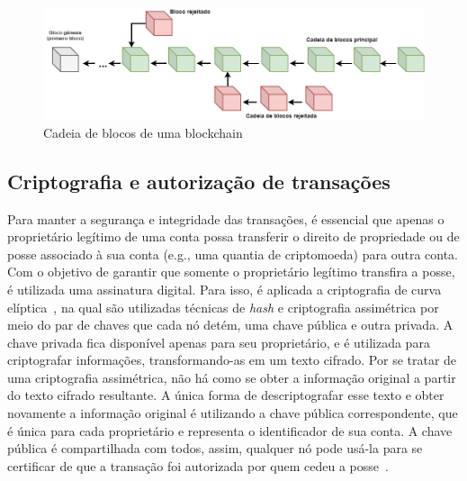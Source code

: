 \begin{figure}[htb]
 \caption{Cadeia de blocos de uma blockchain}
 \label{fig:cadeia_blocos}
 \centering
 \includegraphics[scale=0.4]{figuras/cadeia_de_blocos.png}
\end{figure}
 
\subsection{Criptografia e autorização de transações} \label{tex:fund:blockchain:cripto}

Para manter a segurança e integridade das transações, é essencial que apenas o proprietário legítimo de uma conta possa transferir o direito de propriedade ou de posse associado à sua conta (e.g., uma quantia de criptomoeda) para outra conta. Com o objetivo de garantir que somente o proprietário legítimo transfira a posse, é utilizada uma assinatura digital. Para isso, é aplicada a criptografia de curva elíptica~\cite{koblitz1987elliptic-curve}, na qual são utilizadas técnicas de \textit{hash} e criptografia assimétrica por meio do par de chaves que cada nó detém, uma chave pública e outra privada. A chave privada fica disponível apenas para seu proprietário, e é utilizada para criptografar informações, transformando-as em um texto cifrado. Por se tratar de uma criptografia assimétrica, não há como se obter a informação original a partir do texto cifrado resultante. A única forma de descriptografar esse texto e obter novamente a informação original é utilizando a chave pública correspondente, que é única para cada proprietário e representa o identificador de sua conta. A chave pública é compartilhada com todos, assim, qualquer nó pode usá-la para se certificar de que a transação foi autorizada por quem cedeu a posse~\cite{overview-blockchainbasic2018drescher, overview-ahmed-2019}.

